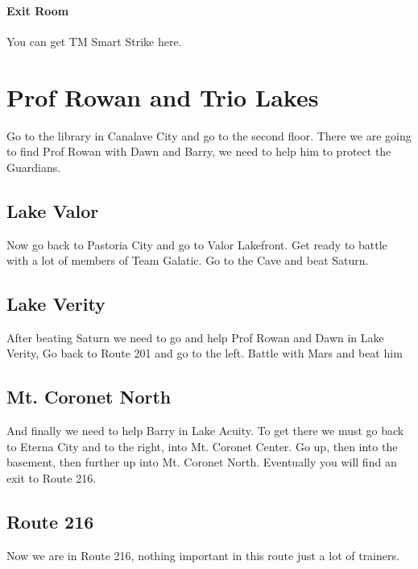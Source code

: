 \documentclass[11pt]{article}
\begin{document}
\paragraph{Exit Room}
You can get TM Smart Strike here.



\section{Prof Rowan and Trio Lakes}\label{sec:prof-rowan-and-trio-lakes}
Go to the library in Canalave City and go to the second floor.
There we are going to find Prof Rowan with Dawn and Barry,
we need to help him to protect the Guardians.

\subsection{Lake Valor}\label{subsec:lake-valor}
Now go back to Pastoria City and go to Valor Lakefront.
Get ready to battle with a lot of members of Team Galatic.
Go to the Cave and beat Saturn.





\subsection{Lake Verity}\label{subsec:lake-verity}
After beating Saturn we need to go and help Prof Rowan and Dawn in Lake Verity, Go back to Route 201 and go to the left.
Battle with Mars and beat him

\subsection{Mt. Coronet North}\label{subsec:mt.-coronet-north}
And finally we need to help Barry in Lake Acuity.
To get there we must go back to Eterna City and to the right, into Mt. Coronet Center.
Go up, then into the basement, then further up into Mt. Coronet North.
Eventually you will find an exit to Route 216.




\subsection{Route 216}\label{subsec:route-2162}
Now we are in Route 216, nothing important in this route just a lot of trainers.
\end{document}
